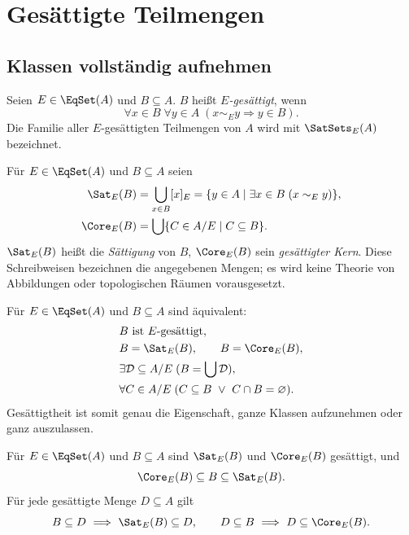 \chapter{Gesättigte Teilmengen}
\label{b11guide:ch:saturation}

\section{Klassen vollständig aufnehmen}

\begin{definition}
Seien $E\in\EqSet(A)$ und $B\subseteq A$.
$B$ heißt \emph{$E$-gesättigt}, wenn
\[
 \forall x\in B\;\forall y\in A\;
          (x\sim_E y\Rightarrow y\in B).
\]
Die Familie aller $E$-gesättigten Teilmengen von $A$ wird mit
$\SatSets_E(A)$ bezeichnet.
\end{definition}

\begin{definition}
\label{b11guide:def:saturation}
Für $E\in\EqSet(A)$ und $B\subseteq A$ seien
\[
\begin{aligned}
 \Sat_E(B)&=\bigcup_{x\in B}[x]_E
           =\{y\in A\mid \exists x\in B\;(x\sim_E y)\},\\
 \Core_E(B)&=\bigcup\{C\in A/E\mid C\subseteq B\}.
\end{aligned}
\]
$\Sat_E(B)$ heißt die \emph{Sättigung} von $B$,
$\Core_E(B)$ sein \emph{gesättigter Kern}.
Diese Schreibweisen bezeichnen die angegebenen Mengen;
es wird keine Theorie von Abbildungen oder topologischen Räumen
vorausgesetzt.
\end{definition}

\begin{theorem}
\label{b11guide:thm:saturated}
Für $E\in\EqSet(A)$ und $B\subseteq A$ sind äquivalent:
\[
\begin{aligned}
 &B\text{ ist }E\text{-gesättigt},\\
 &B=\Sat_E(B),\qquad B=\Core_E(B),\\
 &\exists\mathcal D\subseteq A/E\;(B=\bigcup\mathcal D),\\
 &\forall C\in A/E\;(C\subseteq B\ \lor\ C\cap B=\varnothing).
\end{aligned}
\]
Gesättigtheit ist somit genau die Eigenschaft, ganze Klassen
aufzunehmen oder ganz auszulassen.
\end{theorem}

\begin{theorem}
\label{b11guide:thm:bounds}
Für $E\in\EqSet(A)$ und $B\subseteq A$ sind
$\Sat_E(B)$ und $\Core_E(B)$ gesättigt, und
\[
 \Core_E(B)\subseteq B\subseteq\Sat_E(B).
\]
Für jede gesättigte Menge $D\subseteq A$ gilt
\[
 B\subseteq D\ \Longrightarrow\ \Sat_E(B)\subseteq D,
 \qquad
 D\subseteq B\ \Longrightarrow\ D\subseteq\Core_E(B).
\]
\end{theorem}

